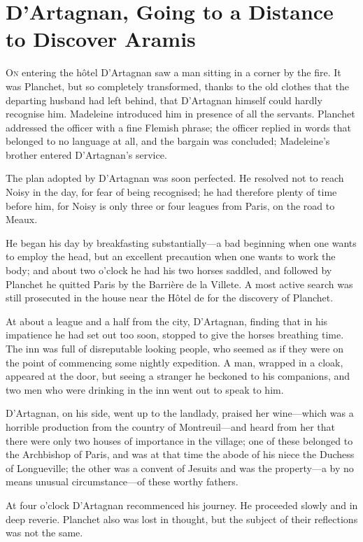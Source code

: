 \chapter{D'Artagnan, Going to a Distance to Discover Aramis}

 \lettrine{O}{n} entering the hôtel D'Artagnan saw a man sitting in a corner by the fire. It was Planchet, but so completely transformed, thanks to the old clothes that the departing husband had left behind, that D'Artagnan himself could hardly recognise him. Madeleine introduced him in presence of all the servants. Planchet addressed the officer with a fine Flemish phrase; the officer replied in words that belonged to no language at all, and the bargain was concluded; Madeleine's brother entered D'Artagnan's service.

The plan adopted by D'Artagnan was soon perfected. He resolved not to reach Noisy in the day, for fear of being recognised; he had therefore plenty of time before him, for Noisy is only three or four leagues from Paris, on the road to Meaux.

He began his day by breakfasting substantially—a bad beginning when one wants to employ the head, but an excellent precaution when one wants to work the body; and about two o'clock he had his two horses saddled, and followed by Planchet he quitted Paris by the Barrière de la Villete. A most active search was still prosecuted in the house near the Hôtel de  for the discovery of Planchet.

At about a league and a half from the city, D'Artagnan, finding that in his impatience he had set out too soon, stopped to give the horses breathing time. The inn was full of disreputable looking people, who seemed as if they were on the point of commencing some nightly expedition. A man, wrapped in a cloak, appeared at the door, but seeing a stranger he beckoned to his companions, and two men who were drinking in the inn went out to speak to him.

D'Artagnan, on his side, went up to the landlady, praised her wine—which was a horrible production from the country of Montreuil—and heard from her that there were only two houses of importance in the village; one of these belonged to the Archbishop of Paris, and was at that time the abode of his niece the Duchess of Longueville; the other was a convent of Jesuits and was the property—a by no means unusual circumstance—of these worthy fathers.

At four o'clock D'Artagnan recommenced his journey. He proceeded slowly and in deep reverie. Planchet also was lost in thought, but the subject of their reflections was not the same.

